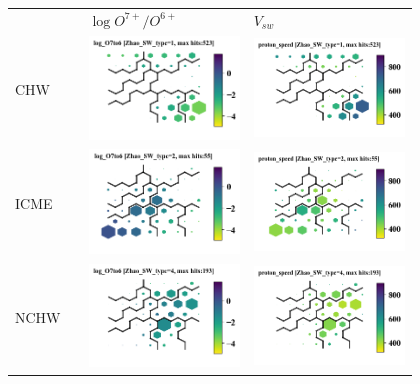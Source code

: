 \documentclass[utf8]{frontiersSCNS} %
\begin{document}
\begin{figure}[h!]\centering
	\begin{tabular}{m{2.5cm}CCC}
		 & & $\log O^{7+}/O^{6+}$ & $V_{sw}$ \\
		CHW & & \includegraphics[width=4cm]{Roberts/SWtype-Zhao_SW_type-1-log_O7to6} &
		\includegraphics[width=4cm]{Roberts/SWtype-Zhao_SW_type-1-proton_speed}\hfill	\\
		ICME & & \includegraphics[width=4cm]{Roberts/SWtype-Zhao_SW_type-2-log_O7to6} &
		\includegraphics[width=4cm]{Roberts/SWtype-Zhao_SW_type-2-proton_speed}\hfill	\\
		NCHW & & \includegraphics[width=4cm]{Roberts/SWtype-Zhao_SW_type-4-log_O7to6} &
		\includegraphics[width=4cm]{Roberts/SWtype-Zhao_SW_type-4-proton_speed}\hfill \\

\end{tabular}
\end{figure}
\end{document}

